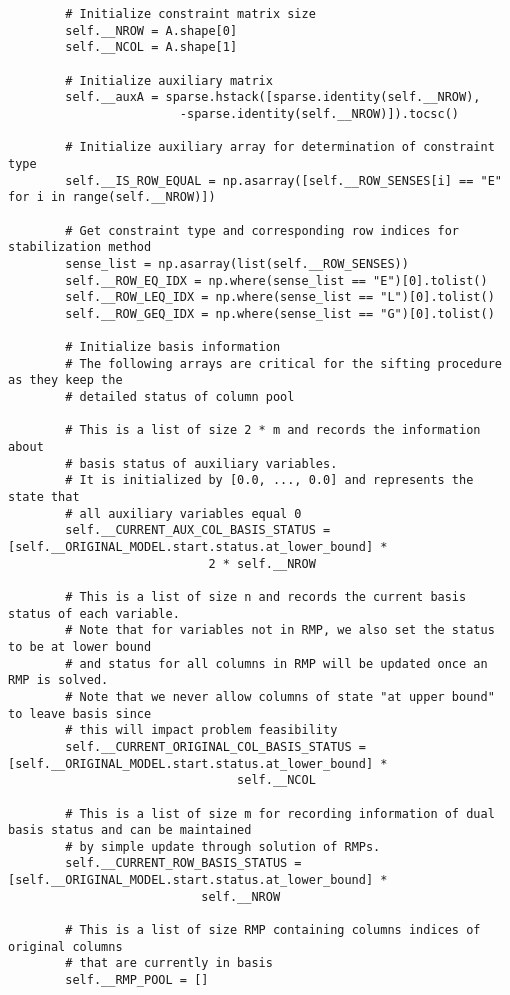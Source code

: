 \documentclass{article}
\begin{document}
\begin{lstlisting}
        # Initialize constraint matrix size
        self.__NROW = A.shape[0]
        self.__NCOL = A.shape[1]

        # Initialize auxiliary matrix
        self.__auxA = sparse.hstack([sparse.identity(self.__NROW),
        			    -sparse.identity(self.__NROW)]).tocsc()

        # Initialize auxiliary array for determination of constraint type
        self.__IS_ROW_EQUAL = np.asarray([self.__ROW_SENSES[i] == "E" for i in range(self.__NROW)])

        # Get constraint type and corresponding row indices for stabilization method
        sense_list = np.asarray(list(self.__ROW_SENSES))
        self.__ROW_EQ_IDX = np.where(sense_list == "E")[0].tolist()
        self.__ROW_LEQ_IDX = np.where(sense_list == "L")[0].tolist()
        self.__ROW_GEQ_IDX = np.where(sense_list == "G")[0].tolist()

        # Initialize basis information
        # The following arrays are critical for the sifting procedure as they keep the 
        # detailed status of column pool

        # This is a list of size 2 * m and records the information about 
        # basis status of auxiliary variables. 
        # It is initialized by [0.0, ..., 0.0] and represents the state that 
        # all auxiliary variables equal 0
        self.__CURRENT_AUX_COL_BASIS_STATUS = [self.__ORIGINAL_MODEL.start.status.at_lower_bound] * 
        					2 * self.__NROW

        # This is a list of size n and records the current basis status of each variable. 
        # Note that for variables not in RMP, we also set the status to be at lower bound 
        # and status for all columns in RMP will be updated once an RMP is solved. 
        # Note that we never allow columns of state "at upper bound" to leave basis since 
        # this will impact problem feasibility
        self.__CURRENT_ORIGINAL_COL_BASIS_STATUS = [self.__ORIGINAL_MODEL.start.status.at_lower_bound] * 
        					    self.__NCOL

        # This is a list of size m for recording information of dual basis status and can be maintained 
        # by simple update through solution of RMPs.
        self.__CURRENT_ROW_BASIS_STATUS = [self.__ORIGINAL_MODEL.start.status.at_lower_bound] *
        				   self.__NROW

        # This is a list of size RMP containing columns indices of original columns
        # that are currently in basis
        self.__RMP_POOL = []


\end{lstlisting}
\end{document}
